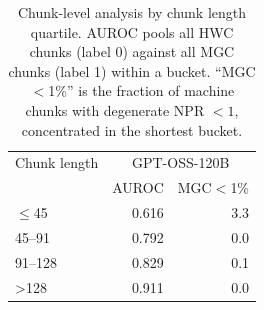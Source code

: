 \begin{table}[t]
\centering
\caption{Chunk-level analysis by chunk length quartile. AUROC pools all HWC chunks (label 0) against all MGC chunks (label 1) within a bucket. ``MGC$<$1\%'' is the fraction of machine chunks with degenerate NPR $<1$, concentrated in the shortest bucket.}
\label{tab:chunk-by-length}
\begin{tabular}{lrr}
\toprule
Chunk length & \multicolumn{2}{c}{GPT-OSS-120B} \\
 & AUROC & MGC$<$1\% \\
\midrule
$\leq$45 & 0.616 & 3.3 \\
45--91 & 0.792 & 0.0 \\
91--128 & 0.829 & 0.1 \\
>128 & 0.911 & 0.0 \\
\bottomrule
\end{tabular}
\end{table}
